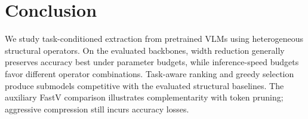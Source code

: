 \documentclass[11pt]{article}
\begin{document}

\section{Conclusion}

We study task-conditioned extraction from pretrained VLMs using heterogeneous structural operators. On the evaluated backbones, width reduction generally preserves accuracy best under parameter budgets, while inference-speed budgets favor different operator combinations. Task-aware ranking and greedy selection produce submodels competitive with the evaluated structural baselines. The auxiliary FastV comparison illustrates complementarity with token pruning; aggressive compression still incurs accuracy losses.
\end{document}
